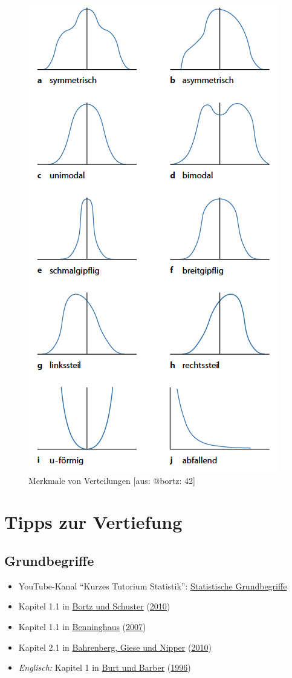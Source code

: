 \documentclass[
  11pt,
  ngerman,
  a4paper,
]{report}
\providecommand{\tightlist}{%
  \setlength{\itemsep}{0pt}\setlength{\parskip}{0pt}}
\begin{document}
\begin{figure}[!h]

{\centering \includegraphics[width=.6\linewidth]{img/shapes} 

}

\caption{Merkmale von Verteilungen [aus: @bortz: 42]}\label{fig:shapes}
\end{figure}

\hypertarget{tipps-zur-vertiefung}{%
\section*{Tipps zur Vertiefung}\label{tipps-zur-vertiefung}}

\hypertarget{grundbegriffe}{%
\subsection{Grundbegriffe}\label{grundbegriffe}}

\begin{itemize}
\tightlist
\item
  YouTube-Kanal \enquote{Kurzes Tutorium Statistik}: \href{https://www.youtube.com/watch?v=bJsBcLjke3Q}{Statistische Grundbegriffe}
\item
  Kapitel 1.1 in \protect\hyperlink{ref-bortz}{Bortz und Schuster} (\protect\hyperlink{ref-bortz}{2010})
\item
  Kapitel 1.1 in \protect\hyperlink{ref-benninghaus}{Benninghaus} (\protect\hyperlink{ref-benninghaus}{2007})
\item
  Kapitel 2.1 in \protect\hyperlink{ref-bahrenberg}{Bahrenberg, Giese und Nipper} (\protect\hyperlink{ref-bahrenberg}{2010})
\item
  \emph{Englisch:} Kapitel 1 in \protect\hyperlink{ref-burt}{Burt und Barber} (\protect\hyperlink{ref-burt}{1996})
\end{itemize}
\end{document}
